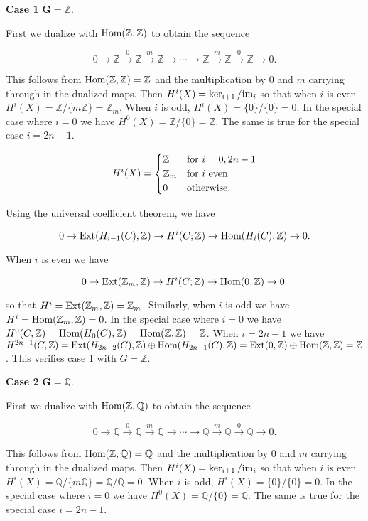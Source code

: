 \documentclass{article}
\newcommand{\Z}{\mathbb{Z}}
\newcommand{\Q}{\mathbb{Q}}
\newcommand{\Hom}{\textnormal{Hom}}
\newcommand{\Ext}{\textnormal{Ext}}
\newcommand{\im}{\textnormal{im}}
\begin{document}
\textbf{Case 1} $\mathbf{G = \Z}$.

First we dualize with $\Hom(\Z, \Z)$ to obtain the sequence

$$0\to \Z\xrightarrow{0} \Z\xrightarrow{m} \Z\to \cdots \to \Z \xrightarrow{m}\Z \xrightarrow{0}\Z\to 0.$$

This follows from $\Hom(\Z, \Z) = \Z$ and the multiplication by 0 and $m$ carrying through in the dualized maps. Then $H^{i}(X) = \ker_{i+1}/\im_{i}$ so that when $i$ is even $H^{i}(X) = \Z/\{m\Z\} = \Z_{m}$. When $i$ is odd, $H^{i}(X) = \{0\}/\{0\} = 0$. In the special case where $i = 0$ we have $H^{0}(X) = \Z/\{0\} = \Z$. The same is true for the special case $i = 2n-1$.

\[H^{i}(X) = \begin{cases} \Z & \textnormal{for } i=0, 2n-1\\
\Z_{m} & \textnormal{for } i\textnormal{ even}\\
0 & \textnormal{otherwise}. \end{cases}\]
\medskip

Using the universal coefficient theorem, we have

$$0\to \Ext(H_{i-1}(C), \Z)\to H^{i}(C;\Z)\to \Hom(H_{i}(C),\Z)\to 0.$$

When $i$ is even we have

$$0\to \Ext(\Z_{m}, \Z)\to H^{i}(C;\Z)\to \Hom(0,\Z)\to 0.$$

so that $H^{i} = \Ext(\Z_{m},\Z) = \Z_{m}$. Similarly, when $i$ is odd we have $H^{i} = \Hom(\Z_{m},\Z) = 0$. In the special case where $i = 0$ we have $H^{0}(C, \Z) = \Hom(H_{0}(C), \Z) = \Hom(\Z, \Z) = \Z$. When $i = 2n-1$ we have $H^{2n-1}(C, \Z) = \Ext(H_{2n-2}(C), \Z)\oplus\Hom(H_{2n-1}(C), \Z) = \Ext(0, \Z)\oplus\Hom(\Z, \Z) = \Z$. This verifies case 1 with $G = \Z$.
\bigskip

\textbf{Case 2} $\mathbf{G = \Q}$.

First we dualize with $\Hom(\Z, \Q)$ to obtain the sequence

$$0\to \Q\xrightarrow{0} \Q\xrightarrow{m} \Q\to \cdots \to \Q \xrightarrow{m}\Q \xrightarrow{0}\Q\to 0.$$

This follows from $\Hom(\Z, \Q) = \Q$ and the multiplication by 0 and $m$ carrying through in the dualized maps. Then $H^{i}(X) = \ker_{i+1}/\im_{i}$ so that when $i$ is even $H^{i}(X) = \Q/\{m\Q\} = \Q/\Q = 0$. When $i$ is odd, $H^{i}(X) = \{0\}/\{0\} = 0$. In the special case where $i = 0$ we have $H^{0}(X) = \Q/\{0\} = \Q$. The same is true for the special case $i = 2n-1$.
\end{document}
